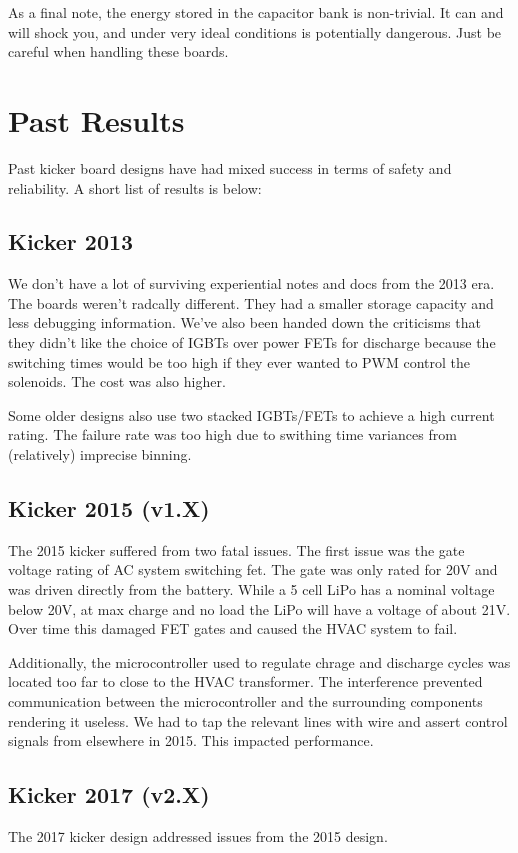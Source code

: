 \documentclass[12pt, letterpaper]{article}
\begin{document}
As a final note, the energy stored in the capacitor bank is non-trivial. It can and will shock you, and under very ideal conditions is potentially dangerous. Just be careful when handling these boards.

\section{Past Results}
Past kicker board designs have had mixed success in terms of safety and reliability. A short list of results is below:

\subsection{Kicker 2013}
We don't have a lot of surviving experiential notes and docs from the 2013 era. The boards weren't radcally different. They had a smaller storage capacity and less debugging information. We've also been handed down the criticisms that they didn't like the choice of IGBTs over power FETs for discharge because the switching times would be too high if they ever wanted to PWM control the solenoids. The cost was also higher. 

Some older designs also use two stacked IGBTs/FETs to achieve a high current rating. The failure rate was too high due to swithing time variances from (relatively) imprecise binning. 

\subsection{Kicker 2015 (v1.X)}
The 2015 kicker suffered from two fatal issues. The first issue was the gate voltage rating of AC system switching fet. The gate was only rated for 20V and was driven directly from the battery. While a 5 cell LiPo has a nominal voltage below 20V, at max charge and no load the LiPo will have a voltage of about 21V. Over time this damaged FET gates and caused the HVAC system to fail.

Additionally, the microcontroller used to regulate chrage and discharge cycles was located too far to close to the HVAC transformer. The interference prevented communication between the microcontroller and the surrounding components rendering it useless. We had to tap the relevant lines with wire and assert control signals from elsewhere in 2015. This impacted performance.

\subsection{Kicker 2017 (v2.X)}
The 2017 kicker design addressed issues from the 2015 design. 
\end{document}
